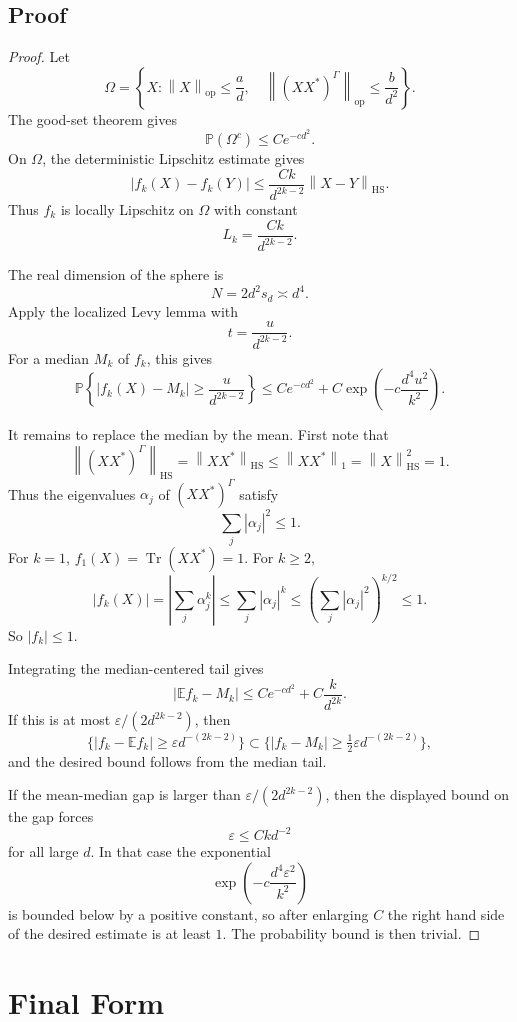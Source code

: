 \documentclass[11pt,oneside]{book}
\DeclareMathOperator{\Tr}{Tr}
\newcommand{\E}{\mathbb E}
\newcommand{\Prob}{\mathbb P}
\newcommand{\1}{\mathbf 1}
\newcommand{\eps}{\varepsilon}
\newcommand{\GammaPT}{\Gamma}
\newcommand{\HS}{\mathrm{HS}}
\newcommand{\op}{\mathrm{op}}
\newcommand{\norm}[1]{\left\|#1\right\|}
\begin{document}
\section{Proof}

\begin{proof}
Let
\[
  \Omega
  =
  \left\{
    X:\norm X_{\op}\le \frac ad,\quad
    \norm{(XX^*)^{\GammaPT}}_{\op}\le \frac b{d^2}
  \right\}.
\]
The good-set theorem gives
\[
  \Prob(\Omega^c)\le C e^{-cd^2}.
\]
On \(\Omega\), the deterministic Lipschitz estimate gives
\[
  |f_k(X)-f_k(Y)|
  \le
  \frac{Ck}{d^{2k-2}}\norm{X-Y}_{\HS}.
\]
Thus \(f_k\) is locally Lipschitz on \(\Omega\) with constant
\[
  L_k=\frac{Ck}{d^{2k-2}}.
\]

The real dimension of the sphere is
\[
  N=2d^2s_d\asymp d^4.
\]
Apply the localized Levy lemma with
\[
  t=\frac u{d^{2k-2}}.
\]
For a median \(M_k\) of \(f_k\), this gives
\[
  \Prob\left\{
    |f_k(X)-M_k|\ge\frac u{d^{2k-2}}
  \right\}
  \le
  C e^{-cd^2}
  +
  C\exp\left(-c\frac{d^4u^2}{k^2}\right).
\]

It remains to replace the median by the mean.  First note that
\[
  \norm{(XX^*)^{\GammaPT}}_{\HS}
  =
  \norm{XX^*}_{\HS}
  \le
  \norm{XX^*}_1
  =
  \norm X_{\HS}^2
  =
  1.
\]
Thus the eigenvalues \(\alpha_j\) of \((XX^*)^{\GammaPT}\) satisfy
\[
  \sum_j|\alpha_j|^2\le1.
\]
For \(k=1\), \(f_1(X)=\Tr(XX^*)=1\).  For \(k\ge2\),
\[
  |f_k(X)|
  =
  \left|\sum_j\alpha_j^k\right|
  \le
  \sum_j|\alpha_j|^k
  \le
  \left(\sum_j|\alpha_j|^2\right)^{k/2}
  \le1.
\]
So \(|f_k|\le1\).

Integrating the median-centered tail gives
\[
  |\E f_k-M_k|
  \le
  C e^{-cd^2}
  +
  C\frac{k}{d^{2k}}.
\]
If this is at most \(\eps/(2d^{2k-2})\), then
\[
  \{|f_k-\E f_k|\ge \eps d^{-(2k-2)}\}
  \subset
  \{|f_k-M_k|\ge \tfrac12\eps d^{-(2k-2)}\},
\]
and the desired bound follows from the median tail.

If the mean-median gap is larger than \(\eps/(2d^{2k-2})\), then the displayed
bound on the gap forces
\[
  \eps\le Ckd^{-2}
\]
for all large \(d\).  In that case the exponential
\[
  \exp\left(-c\frac{d^4\eps^2}{k^2}\right)
\]
is bounded below by a positive constant, so after enlarging \(C\) the right
hand side of the desired estimate is at least \(1\).  The probability bound is
then trivial.
\end{proof}

\chapter{Final Form}
\end{document}
